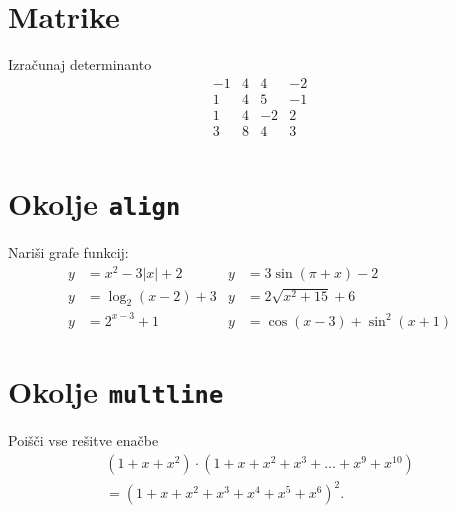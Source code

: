 \documentclass[a4paper,12pt]{article}
\begin{document}
\section*{Matrike}
Izračunaj determinanto
\[
\begin{matrix}
    -1 & 4 & 4 & -2 \\
    1 & 4 & 5 & -1 \\
    1 & 4 & -2 & 2 \\
    3 & 8 & 4 & 3 \\

\end{matrix}
\]

\section*{Okolje \texttt{align}}
Nariši grafe funkcij:
\begin{align*}
y &= x^2 - 3|x| + 2
& y &= 3\sin(\pi+x)-2 \\
y &= \log_2(x-2)+3
& y &= 2\sqrt{x^2+15}+6 \\
y &= 2^{x-3}+1
& y &= \cos(x-3)+\sin^2(x+1)
\end{align*}

\section*{Okolje \texttt{multline}}
Poišči vse rešitve enačbe
\begin{multline*}
(1+x+x^2)\cdot
(1+x+x^2+x^3+\ldots+x^9+x^{10})\\
=(1+x+x^2+x^3+x^4+x^5+x^6)^2.
\end{multline*}
\end{document}
